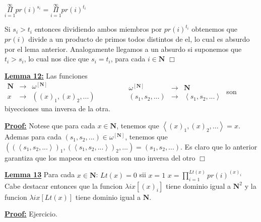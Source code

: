     $\displaystyle \underset{i=1}{\overset{\infty }{\Pi }}pr(i)^{s_{i}}=\underset{i=1}{\overset{ \infty }{\Pi }}pr(i)^{t_{i}} $

    Si $s_{i} >t_{i}$ entonces dividiendo ambos miembros por $pr(i)^{t_{i}}$ obtenemos que $pr(i)$ divide a un producto de primos todos distintos de el, lo cual es absurdo por el lema anterior. Analogamente llegamos a un absurdo si suponemos que $t_{i} >s_{i}$, lo cual nos dice que $s_{i}=t_{i}$, para cada $i\in \mathbf{N}$ $\Box$

  \QED


  \textbf{\underline{Lemma 12:}} Las funciones
    $\displaystyle \begin{array}{lll} \mathbf{N} & \rightarrow & \omega ^{\left[ \mathbf{N}\right] } \\ x & \rightarrow & ((x)_{1},(x)_{2},...) \end{array} \ \ \ \ \ \ \ \ \ \ \ \ \ \ \ \ \ \ \begin{array}{rll} \omega ^{\left[ \mathbf{N}\right] } & \rightarrow & \mathbf{N} \\ (s_{1},s_{2},...) & \rightarrow & \left\langle s_{1},s_{2},...\right\rangle \end{array} $
    son biyecciones una inversa de la otra.

  \textbf{\underline{Proof:}} Notese que para cada $x\in \mathbf{N}$, tenemos que $\left\langle (x)_{1},(x)_{2},...\right\rangle =x$. Ademas para cada $(s_{1},s_{2},...)\in \omega ^{\left[ \mathbf{N}\right] }$, tenemos que $((\left\langle s_{1},s_{2},...\right\rangle )_{1},(\left\langle s_{1},s_{2},...\right\rangle )_{2},...)=(s_{1},s_{2},...)$. Es claro que lo anterior garantiza que los mapeos en cuestion son uno inversa del otro $\Box$

  \QED


  \textbf{\underline{Lemma 13}} Para cada $x\in \mathbf{N}$:
    $Lt(x)=0$ sii $x=1$
    $x=\prod\nolimits_{i=1}^{Lt(x)}pr(i)^{(x)_{i}}$
    Cabe destacar entonces que la funcion $\lambda ix[(x)_{i}]$ tiene dominio igual a $\mathbf{N}^{2}$ y la funcion $\lambda ix[Lt(x)]$ tiene dominio igual a $\mathbf{N}$.

  \textbf{\underline{Proof:}} Ejercicio.

  \QED
